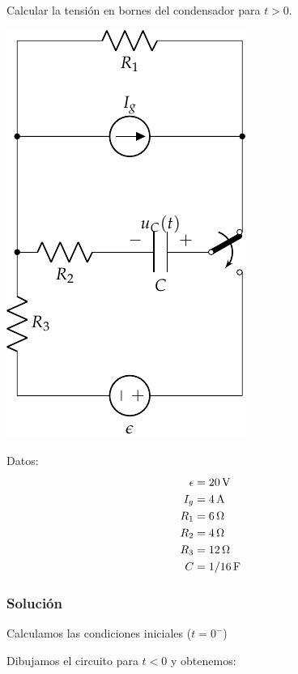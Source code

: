 \documentclass[12pt]{article}
\begin{document}
Calcular la tensión en bornes del condensador para $t > 0$.

\begin{minipage}{0.5\textwidth}
  \includegraphics[scale=0.85]{figs/FM_4_3}
\end{minipage}
\hfill
\begin{minipage}{0.5\textwidth}
Datos:
\begin{align*}
  \epsilon &= \SI{20}{\volt}\\
  I_g &= \SI{4}{\ampere}\\
  R_1 &= \SI{6}{\ohm}\\
  R_2 &= \SI{4}{\ohm}\\
  R_3 &= \SI{12}{\ohm}\\
  C &= \SI[parse-numbers=false]{1/16}{\farad}      
\end{align*}

\end{minipage}

\subsubsection*{Solución}

Calculamos las condiciones iniciales ($t = 0^-$)

Dibujamos el circuito para $t < 0$ y obtenemos:
\end{document}

